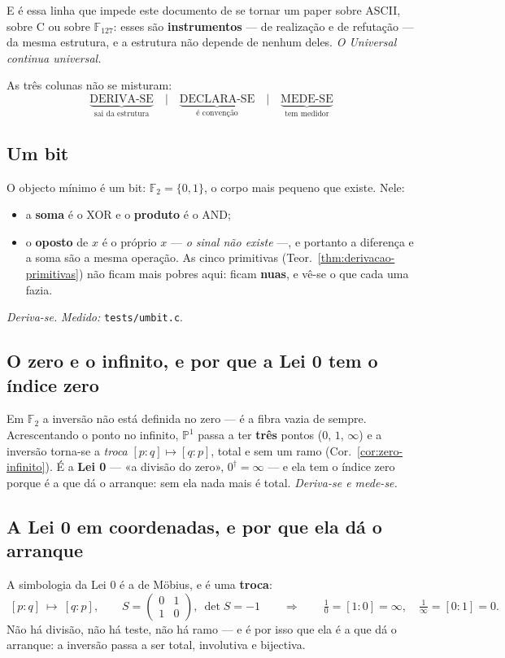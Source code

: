 \documentclass[11pt,a4paper]{article}
\newcommand{\code}[1]{\texttt{\small #1}}
\begin{document}
\noindent E é essa linha que impede este documento de se tornar um paper
sobre ASCII, sobre C ou sobre $\mathbb{F}_{127}$: esses são
\textbf{instrumentos} --- de realização e de refutação --- da mesma
estrutura, e a estrutura não depende de nenhum deles. \emph{O Universal
continua universal.}

\medskip
\noindent As três colunas não se misturam:
\[
\boxed{\;
\underbrace{\text{DERIVA-SE}}_{\text{sai da estrutura}}
\quad\Big|\quad
\underbrace{\text{DECLARA-SE}}_{\text{é convenção}}
\quad\Big|\quad
\underbrace{\text{MEDE-SE}}_{\text{tem medidor}}
\;}
\]

\subsection*{Um bit}
O objecto mínimo é um bit: $\mathbb{F}_2=\{0,1\}$, o corpo mais pequeno
que existe. Nele:
\begin{itemize}
\item a \textbf{soma} é o XOR e o \textbf{produto} é o AND;
\item o \textbf{oposto} de $x$ é o próprio $x$ --- \emph{o sinal não
existe} ---, e portanto a diferença e a soma são a mesma operação. As
cinco primitivas (Teor.~\ref{thm:derivacao-primitivas}) não ficam mais
pobres aqui: ficam \textbf{nuas}, e vê-se o que cada uma fazia.
\end{itemize}
\emph{Deriva-se.} \emph{Medido:} \code{tests/umbit.c}.

\subsection*{O zero e o infinito, e por que a Lei 0 tem o índice zero}
Em $\mathbb{F}_2$ a inversão não está definida no zero --- é a fibra
vazia de sempre. Acrescentando o ponto no infinito, $\mathbb{P}^1$ passa
a ter \textbf{três} pontos ($0$, $1$, $\infty$) e a inversão torna-se a
\emph{troca} $[p:q]\mapsto[q:p]$, total e sem um ramo
(Cor.~\ref{cor:zero-infinito}). É a \textbf{Lei 0} --- «a divisão do
zero», $0^{\dagger}=\infty$ --- e ela tem o índice zero porque é a que
dá o arranque: sem ela nada mais é total. \emph{Deriva-se e mede-se.}

\subsection*{A Lei 0 em coordenadas, e por que ela dá o arranque}
A simbologia da Lei 0 é a de Möbius, e é uma \textbf{troca}:
\[
\boxed{\;[p:q]\ \longmapsto\ [q:p],
\qquad S=\begin{pmatrix}0&1\\1&0\end{pmatrix},\ \det S=-1
\qquad\Longrightarrow\qquad
\tfrac10=[1:0]=\infty,\quad \tfrac1\infty=[0:1]=0 .\;}
\]
Não há divisão, não há teste, não há ramo --- e é por isso que ela é a que dá o
arranque: a inversão passa a ser total, involutiva e bijectiva.
\end{document}
